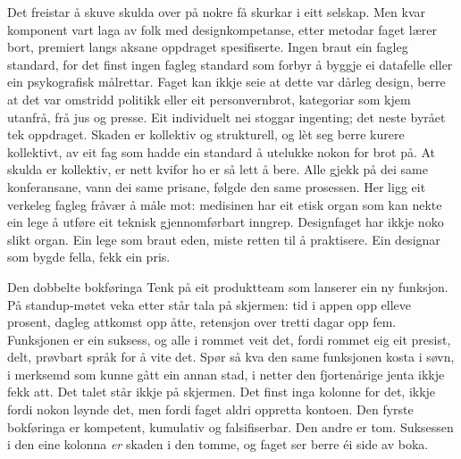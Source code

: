 Det freistar å skuve skulda over på nokre få skurkar i eitt selskap. Men kvar komponent vart laga av folk med designkompetanse, etter metodar faget lærer bort, premiert langs aksane oppdraget spesifiserte. Ingen braut ein fagleg standard, for det finst ingen fagleg standard som forbyr å byggje ei datafelle eller ein psykografisk målrettar. Faget kan ikkje seie at dette var dårleg design, berre at det var omstridd politikk eller eit personvernbrot, kategoriar som kjem utanfrå, frå jus og presse. Eit individuelt nei stoggar ingenting; det neste byrået tek oppdraget. Skaden er kollektiv og strukturell, og lèt seg berre kurere kollektivt, av eit fag som hadde ein standard å utelukke nokon for brot på. At skulda er kollektiv, er nett kvifor ho er så lett å bere. Alle gjekk på dei same konferansane, vann dei same prisane, følgde den same prosessen. Her ligg eit verkeleg fagleg fråvær å måle mot: medisinen har eit etisk organ som kan nekte ein lege å utføre eit teknisk gjennomførbart inngrep. Designfaget har ikkje noko slikt organ. Ein lege som braut eden, miste retten til å praktisere. Ein designar som bygde fella, fekk ein pris.

\begin{kasus}{Den dobbelte bokføringa}
Tenk på eit produktteam som lanserer ein ny funksjon. På standup-møtet veka etter står tala på skjermen: tid i appen opp elleve prosent, dagleg attkomst opp åtte, retensjon over tretti dagar opp fem. Funksjonen er ein suksess, og alle i rommet veit det, fordi rommet eig eit presist, delt, prøvbart språk for å vite det. Spør så kva den same funksjonen kosta i søvn, i merksemd som kunne gått ein annan stad, i netter den fjortenårige jenta ikkje fekk att. Det talet står ikkje på skjermen. Det finst inga kolonne for det, ikkje fordi nokon løynde det, men fordi faget aldri oppretta kontoen. Den fyrste bokføringa er kompetent, kumulativ og falsifiserbar. Den andre er tom. Suksessen i den eine kolonna \emph{er} skaden i den tomme, og faget ser berre éi side av boka.
\end{kasus}


